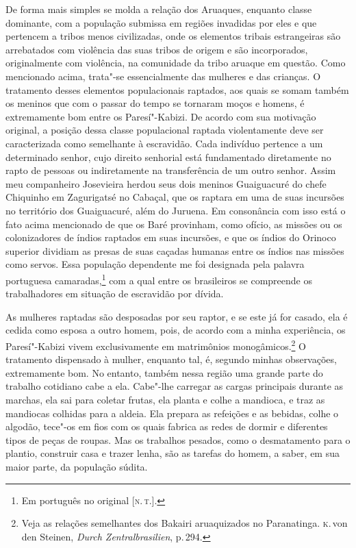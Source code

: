 De forma mais simples se molda a relação dos Aruaques, enquanto classe
dominante, com a população submissa em regiões invadidas por eles e que
pertencem a tribos menos civilizadas, onde os elementos tribais
estrangeiras são arrebatados com violência das suas tribos de origem e
são incorporados, originalmente com violência, na comunidade da tribo
aruaque em questão. Como mencionado acima, trata"-se essencialmente das
mulheres e das crianças. O tratamento desses elementos populacionais
raptados, aos quais se somam também os meninos que com o passar do
tempo se tornaram moços e homens, é extremamente bom entre os
Paresí"-Kabizi. De acordo com sua motivação original, a posição dessa
classe populacional raptada violentamente deve ser caracterizada como
semelhante à escravidão. Cada indivíduo pertence a um determinado
senhor, cujo direito senhorial está fundamentado diretamente no rapto de
pessoas ou indiretamente na transferência de um outro senhor. Assim meu
companheiro Josevieira herdou seus dois meninos Guaiguacuré do chefe
Chiquinho em Zagurigatsé no Cabaçal, que os raptara em uma de suas
incursões no território dos Guaiguacuré, além do Juruena. Em consonância
com isso está o fato acima mencionado de que os Baré provinham, como
ofício, as missões ou os colonizadores de índios raptados em suas
incursões, e que os índios do Orinoco superior dividiam as presas de
suas caçadas humanas entre os índios nas missões como servos. Essa
população dependente me foi designada pela palavra portuguesa
camaradas,\footnote{Em português no original {[}\textsc{n.\,t.}{]}.} com a qual entre os brasileiros se compreende os
trabalhadores em situação de escravidão por dívida.

As mulheres raptadas são desposadas por seu raptor, e se este já for
casado, ela é cedida como esposa a outro homem, pois, de acordo com a
minha experiência, os Paresí"-Kabizi vivem exclusivamente em matrimônios
monogâmicos.\footnote{Veja as relações semelhantes dos Bakairi aruaquizados no Paranatinga.
  \textsc{k}.\,von den Steinen, \textit{Durch Zentralbrasilien}, p.\,294.} O
tratamento dispensado à mulher, enquanto tal, é, segundo minhas
observações, extremamente bom. No entanto, também nessa região uma
grande parte do trabalho cotidiano cabe a ela. Cabe"-lhe carregar as
cargas principais durante as marchas, ela sai para coletar frutas, ela
planta e colhe a mandioca, e traz as mandiocas colhidas para a aldeia.
Ela prepara as refeições e as bebidas, colhe o algodão, tece"-os em fios
com os quais fabrica as redes de dormir e diferentes tipos de peças de
roupas. Mas os trabalhos pesados, como o desmatamento para o plantio,
construir casa e trazer lenha, são as tarefas do homem, a saber, em sua
maior parte, da população súdita.

